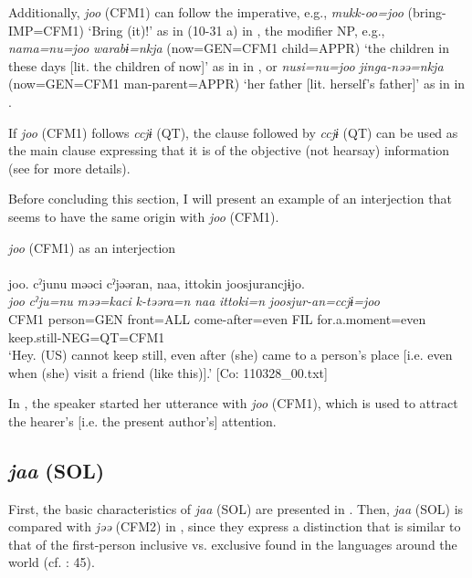 \begin{xlist}
Additionally, \textit{joo} (CFM1) can follow the imperative, e.g., \textit{mukk-oo=joo} (bring-IMP=CFM1) ‘Bring (it)!’ as in (10-31 a) in , the modifier NP, e.g., \textit{nama=nu=joo} \textit{warabɨ=nkja} (now=GEN=CFM1 child=APPR) ‘the children in these days [lit. the children of now]’ as in  in , or \textit{nusi=nu=joo} \textit{jinga-nəə=nkja} (now=GEN=CFM1 man-parent=APPR) ‘her father [lit. herself’s father]’ as in  in .

  If \textit{joo} (CFM1) follows \textit{ccjɨ} (QT), the clause followed by \textit{ccjɨ} (QT) can be used as the main clause expressing that it is of the objective (not hearsay) information (see  for more details).

  Before concluding this section, I will present an example of an interjection that seems to have the same origin with \textit{joo} (CFM1).

\ea\label{ex:10.89}   \textit{joo} (CFM1) as an interjection\\\\
      \glll    joo.  cˀjunu  məəci  cˀjəəran,  naa,  {\textbar}ittoki{\textbar}n  joosjurancjɨjo.\\
    \textit{joo}  \textit{cˀju=nu}  \textit{məə=kaci}  \textit{k-təəra=n}  \textit{naa}  \textit{ittoki=n}   \textit{joosjur-an=ccjɨ=joo}\\
    CFM1  person=GEN  front=ALL  come-after=even  FIL  for.a.moment=even  keep.still-NEG=QT=CFM1\\
\glt     ‘Hey. (US) cannot keep still, even after (she) came to a person’s place [i.e. even when (she) visit a friend (like this)].’  [Co: 110328\_00.txt]
\z

In , the speaker started her utterance with \textit{joo} (CFM1), which is used to attract the hearer’s [i.e. the present author’s] attention.

\subsection{\textit{jaa} (SOL)}\label{sec:10.5.2}

First, the basic characteristics of \textit{jaa} (SOL) are presented in . Then, \textit{jaa} (SOL) is compared with \textit{jəə} (CFM2) in , since they express a distinction that is similar to that of the first-person inclusive vs. exclusive found in the languages around the world (cf. \citealt{Payne1997}: 45).


\end{xlist}
